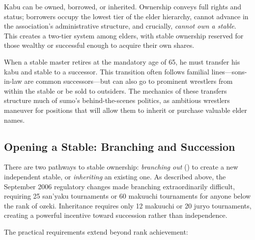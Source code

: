 Kabu can be owned, borrowed, or inherited. Ownership conveys full rights and status; borrowers occupy the lowest tier of the elder hierarchy, cannot advance in the association's administrative structure, and crucially, \textit{cannot own a stable}. This creates a two-tier system among elders, with stable ownership reserved for those wealthy or successful enough to acquire their own shares.

When a stable master retires at the mandatory age of 65, he must transfer his kabu and stable to a successor. This transition often follows familial lines—sons-in-law are common successors—but can also go to prominent wrestlers from within the stable or be sold to outsiders. The mechanics of these transfers structure much of sumo's behind-the-scenes politics, as ambitious wrestlers maneuver for positions that will allow them to inherit or purchase valuable elder names.

\subsection{Opening a Stable: Branching and Succession}

There are two pathways to stable ownership: \textit{branching out} () to create a new independent stable, or \textit{inheriting} an existing one. As described above, the September 2006 regulatory changes made branching extraordinarily difficult, requiring 25 san'yaku tournaments or 60 makuuchi tournaments for anyone below the rank of ozeki. Inheritance requires only 12 makuuchi or 20 juryo tournaments, creating a powerful incentive toward succession rather than independence.

The practical requirements extend beyond rank achievement:


